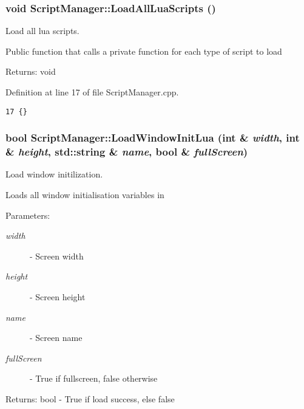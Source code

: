 \hypertarget{class_script_manager_5dbb77caa57366fc35feaaecc9c11032}{
\subsubsection[LoadAllLuaScripts]{\setlength{\rightskip}{0pt plus 5cm}void ScriptManager::LoadAllLuaScripts ()}}
\label{class_script_manager_5dbb77caa57366fc35feaaecc9c11032}


Load all lua scripts. 

Public function that calls a private function for each type of script to load

\begin{Desc}
\item[Returns:]void \end{Desc}


Definition at line 17 of file ScriptManager.cpp.

\begin{Code}\begin{verbatim}17 {}
\end{verbatim}
\end{Code}


\hypertarget{class_script_manager_a44d4ea00ccf0edb0cda447e084b3efc}{
\subsubsection[LoadWindowInitLua]{\setlength{\rightskip}{0pt plus 5cm}bool ScriptManager::LoadWindowInitLua (int \& {\em width}, \/  int \& {\em height}, \/  std::string \& {\em name}, \/  bool \& {\em fullScreen})}}
\label{class_script_manager_a44d4ea00ccf0edb0cda447e084b3efc}


Load window initilization. 

Loads all window initialisation variables in

\begin{Desc}
\item[Parameters:]
\begin{description}
\item[{\em width}]- Screen width \item[{\em height}]- Screen height \item[{\em name}]- Screen name \item[{\em fullScreen}]- True if fullscreen, false otherwise\end{description}
\end{Desc}
\begin{Desc}
\item[Returns:]bool - True if load success, else false \end{Desc}


